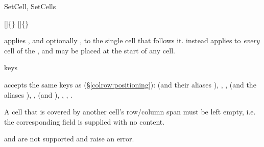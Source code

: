 \begin{codedescribe}[code]{SetCell, SetCells}
  \begin{codesyntax}
    []\{\} 
    \bigskip
    []\{\} 
  \end{codesyntax}
   applies , and optionally , to the single cell that follows it.  instead applies to \emph{every} cell of the , and may be placed at the start of any cell.
  \begin{describelist*}{keys}
  \end{describelist*}
  \begin{tsremark}
     accepts the same keys as  (\S\ref{colrow:positioning}):  (and their aliases ), , ,  (and the aliases ), ,  (and \key{\$,\$\$}), , , .\footnotemark[4]
  \end{tsremark}
  \begin{tsremark}
    A cell that is covered by another cell's row/column span must be left empty, i.e. the corresponding  field is supplied with no content.
  \end{tsremark}
  \begin{tsremark}
     and  are not supported and raise an error.
  \end{tsremark}
\end{codedescribe}

